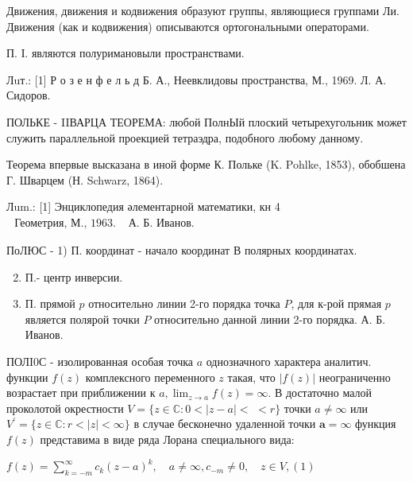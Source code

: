 \documentclass[10pt]{article}
\begin{document}
Движения, движения и кодвижения образуют группы, являющиеся группами Ли. Движения (как и кодвижения) описываются ортогональными операторами.



П. І. являются полуримановыли пространствами.



Лuт.: [1] Р о з е н ф е л ь д Б. А., Неевклидовы пространства, М., 1969. Л. А. Сидоров.



ПОЛЬКЕ - IIВАРЦА ТЕОРЕМА: любой ПолнЫй плоский четырехугольник может служить параллельной проекцией тетраэдра, подобного любому данному.



Теорема впервые высказана в иной форме К. Польке (K. Pohlke, 1853), обобшена Г. Шварцем (Н. Schwarz, 1864).



Лum.: [1] Энциклопедия әлементарной математики, кн 4$\begin{aligned} \text { Геометрия, М., } 1963 . & \text { А. Б. Иванов. }\end{aligned}$



ПоЛЮС - 1) П. координат - начало координат В полярных координатах.



\begin{enumerate}

  \setcounter{enumi}{1}

  \item П.- центр инверсии.



  \item П. прямой $p$ относительно линии 2-го порядка точка $P$, для к-рой прямая $p$ является полярой точки $P$ относительно данной линии 2-го порядка. А. Б. Иванов.



\end{enumerate}



ПОЛI0С - изолированная особая точка $a$ однозначного характера аналитич. функции $f(z)$ комплексного переменного $z$ такая, что $|f(z)|$ неограниченно возрастает при приближении к $a, \lim _{z \rightarrow a} f(z)=\infty$. В достаточно малой проколотой окрестности $V=\{z \in \mathbb{C}: 0<|z-a|<$ $<r\}$ точки $a \neq \infty$ или $V^{\prime}=\{z \in \mathbb{C}: r<|z|<\infty\}$ в случае бесконечно удаленной точки $\boldsymbol{a}=\infty$ функция $f(z)$ представима в виде ряда Лорана специального вида:



$f(z)=\sum_{k=-m}^{\infty} c_{k}(z-a)^{k}, \quad a \neq \infty, c_{-m} \neq 0, \quad z \in V,(1)$
\end{document}
